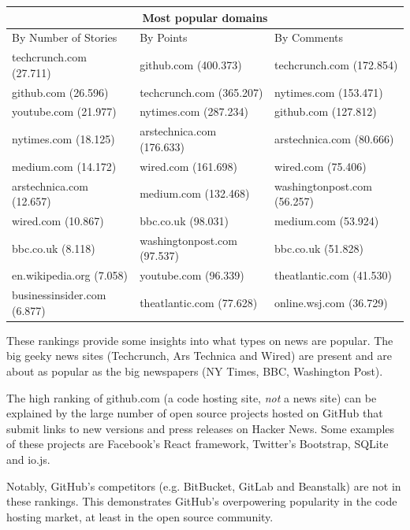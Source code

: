 \begin{center}
    \begin{tabular}{|p{4.5cm}|p{=5cm}|p{5cm}|}
       \hline
       \multicolumn{3}{|c|}{Most popular domains} \\
       \hline
       By Number of Stories 			& By Points 									& By Comments \\
       \hline
       techcrunch.com (27.711) 	& github.com (400.373)		       & techcrunch.com (172.854) \\
		github.com (26.596) 			& techcrunch.com (365.207) 	   & nytimes.com (153.471) \\
		youtube.com (21.977) 		& nytimes.com (287.234)		   & github.com (127.812) \\
		nytimes.com (18.125) 		& arstechnica.com (176.633)	   & arstechnica.com (80.666) \\
		medium.com (14.172) 		& wired.com (161.698)		  	   & wired.com (75.406) \\
		arstechnica.com (12.657) 	& medium.com (132.468)		   & washingtonpost.com (56.257) \\
		wired.com (10.867) 			& bbc.co.uk (98.031)		  		   & medium.com (53.924) \\
		bbc.co.uk (8.118) 				& washingtonpost.com (97.537) & bbc.co.uk (51.828) \\
		en.wikipedia.org (7.058) 		& youtube.com (96.339)		  	   & theatlantic.com (41.530) \\
		businessinsider.com (6.877) & theatlantic.com (77.628)	   & online.wsj.com (36.729) \\
        \hline
    \end{tabular}
\end{center}

These rankings provide some insights into what types on news are popular. The big geeky news sites (Techcrunch, Ars Technica and Wired) are present and are about as popular as the big newspapers (NY Times, BBC, Washington Post). 

The high ranking of github.com (a code hosting site, \textit{not} a news site) can be explained by the large number of open source projects hosted on GitHub that submit links to new versions and press releases on Hacker News. Some examples of these projects are Facebook's React framework, Twitter's Bootstrap, SQLite and io.js. 

Notably, GitHub's competitors (e.g. BitBucket, GitLab and Beanstalk) are not in these rankings. This demonstrates GitHub's overpowering popularity in the code hosting market, at least in the open source community.

